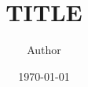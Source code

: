 \documentclass[a4paper]{article}
\title{TITLE}
\date{\today}
\author{Author}
\begin{document}
\maketitle
{\tableofcontents}
\end{document}
